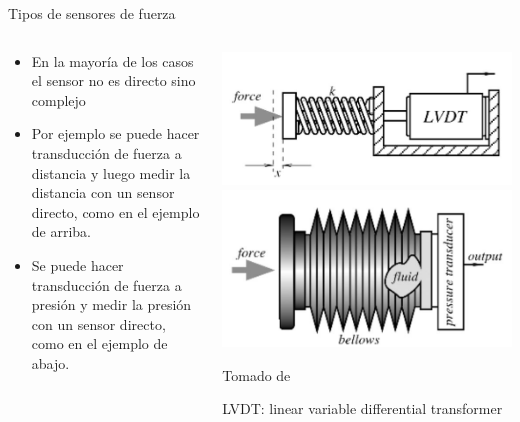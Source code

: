 \documentclass[aspectratio=169]{beamer}
\begin{document}
\begin{frame}{Tipos de sensores de fuerza}
    \begin{columns}[c, onlytextwidth]
        \begin{column}{0.55\textwidth}
            \begin{itemize}
                \item En la mayoría de los casos el sensor no es directo sino complejo
                \item Por ejemplo se puede hacer transducción de fuerza a distancia y luego medir la distancia con un sensor directo, como en el ejemplo de arriba. 
                \item Se puede hacer transducción de fuerza a presión y medir la presión con un sensor directo, como en el ejemplo de abajo. 
            \end{itemize}
        \end{column}
        \begin{column}{0.45\textwidth}
            \centering
            \includegraphics[width = 0.8\linewidth]{fig/Fuerza_Vibracion/fuerza1.JPG}
            \includegraphics[width = 0.8\linewidth]{fig/Fuerza_Vibracion/fuerza2.JPG}
            \vspace{0.5cm}
            
            \tiny{Tomado de \cite{Fraden_2016}}
            
            \tiny{LVDT: linear variable differential transformer}
        \end{column}
    \end{columns}
\end{frame}
\end{document}
